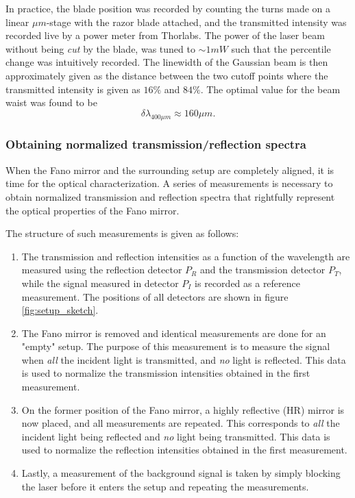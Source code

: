 In practice, the blade position was recorded by counting the turns made on a linear $\mu m$-stage with the razor blade attached, and the transmitted intensity was recorded live by a power meter from Thorlabs. The power of the laser beam without being \emph{cut} by the blade, was tuned to $\sim 1 mW$ such that the percentile change was intuitively recorded. The linewidth of the Gaussian beam is then approximately given as the distance between the two cutoff points where the transmitted intensity is given as $16\%$ and $84\%$. The optimal value for the beam waist was found to be
\begin{equation}
    \delta \lambda_{400 \mu m} \approx 160 \mu m.
\end{equation}

\subsubsection{Obtaining normalized transmission/reflection spectra}

When the Fano mirror and the surrounding setup are completely aligned, it is time for the optical characterization. A series of measurements is necessary to obtain normalized transmission and reflection spectra that rightfully represent the optical properties of the Fano mirror. 

The structure of such measurements is given as follows: 
\begin{enumerate}
    \item The transmission and reflection intensities as a function of the wavelength are measured using the reflection detector $P_R$ and the transmission detector $P_T$, while the signal measured in detector $P_I$ is recorded as a reference measurement. The positions of all detectors are shown in figure \ref{fig:setup_sketch}. 
    \item The Fano mirror is removed and identical measurements are done for an "empty" setup. The purpose of this measurement is to measure the signal when \emph{all} the incident light is transmitted, and \emph{no} light is reflected. This data is used to normalize the transmission intensities obtained in the first measurement. 
    \item On the former position of the Fano mirror, a highly reflective (HR) mirror is now placed, and all measurements are repeated. This corresponds to \emph{all} the incident light being reflected and \emph{no} light being transmitted. This data is used to normalize the reflection intensities obtained in the first measurement.
    \item Lastly, a measurement of the background signal is taken by simply blocking the laser before it enters the setup and repeating the measurements. 
\end{enumerate}

